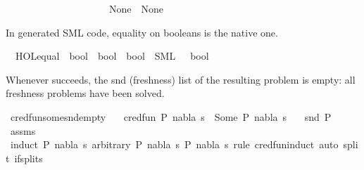 \begin{isabellebody}
\ \ \ \ \ \ \ \ \ \ \ \ \ \ \ \ \ \ \ \ {\isacharbar}{\kern0pt}\ None\ {\isasymRightarrow}\ None{\isacharparenright}{\kern0pt}{\isachardoublequoteclose}%
\begin{isamarkuptext}%
In generated SML code, equality on booleans is the native one.%
\end{isamarkuptext}\isamarkuptrue%
\isamarkupfalse%
\ \ {\isachardoublequoteopen}HOL{\isachardot}{\kern0pt}equal\ {\isacharcolon}{\kern0pt}{\isacharcolon}{\kern0pt}\ bool\ {\isasymRightarrow}\ bool\ {\isasymRightarrow}\ bool{\isachardoublequoteclose}\ {\isasymrightharpoonup}\ {\isacharparenleft}{\kern0pt}SML{\isacharparenright}{\kern0pt}\ {\isachardoublequoteopen}{\isacharbang}{\kern0pt}{\isacharparenleft}{\kern0pt}{\isacharparenleft}{\kern0pt}{\isacharunderscore}{\kern0pt}\ {\isacharcolon}{\kern0pt}\ bool{\isacharparenright}{\kern0pt}\ {\isacharequal}{\kern0pt}\ {\isacharunderscore}{\kern0pt}{\isacharparenright}{\kern0pt}{\isachardoublequoteclose}%
\begin{isamarkuptext}%
Whenever  succeeds, the snd (freshness) list of the resulting problem is empty:
all freshness problems have been solved.%
\end{isamarkuptext}\isamarkuptrue%
\isamarkupfalse%
\ cred{\isacharunderscore}{\kern0pt}fun{\isacharunderscore}{\kern0pt}some{\isacharunderscore}{\kern0pt}snd{\isacharunderscore}{\kern0pt}empty{\isacharcolon}{\kern0pt}\isanewline
\ \ \ {\isachardoublequoteopen}cred{\isacharunderscore}{\kern0pt}fun\ {\isacharparenleft}{\kern0pt}P{\isacharcomma}{\kern0pt}\ nabla{\isacharcomma}{\kern0pt}\ s{\isacharparenright}{\kern0pt}\ {\isacharequal}{\kern0pt}\ Some\ {\isacharparenleft}{\kern0pt}P{\isacharprime}{\kern0pt}{\isacharcomma}{\kern0pt}\ nabla{\isacharprime}{\kern0pt}{\isacharcomma}{\kern0pt}\ s{\isacharprime}{\kern0pt}{\isacharparenright}{\kern0pt}{\isachardoublequoteclose}\isanewline
\ \ \ {\isachardoublequoteopen}snd\ P{\isacharprime}{\kern0pt}\ {\isacharequal}{\kern0pt}\ {\isacharbrackleft}{\kern0pt}{\isacharbrackright}{\kern0pt}{\isachardoublequoteclose}\isanewline
%
\isadelimproof
\ \ %
\endisadelimproof
%
\isatagproof
{}\isamarkupfalse%
\ assms\ \isamarkupfalse%
\ {\isacharparenleft}{\kern0pt}induct\ {\isachardoublequoteopen}{\isacharparenleft}{\kern0pt}P{\isacharcomma}{\kern0pt}\ nabla{\isacharcomma}{\kern0pt}\ s{\isacharparenright}{\kern0pt}{\isachardoublequoteclose}\ arbitrary{\isacharcolon}{\kern0pt}\ P\ nabla\ s\ P{\isacharprime}{\kern0pt}\ nabla{\isacharprime}{\kern0pt}\ s{\isacharprime}{\kern0pt}\ rule{\isacharcolon}{\kern0pt}\ cred{\isacharunderscore}{\kern0pt}fun{\isachardot}{\kern0pt}induct{\isacharcomma}{\kern0pt}\ auto\ split{\isacharcolon}{\kern0pt}\ if{\isacharunderscore}{\kern0pt}splits{\isacharparenright}{\kern0pt}%
\endisatagproof
{\isafoldproof}%
%
\isadelimproof
\isanewline
%
\endisadelimproof
\isanewline
%
\isadelimtheory
%
\endisadelimtheory
%
\isatagtheory
%
\endisatagtheory
{\isafoldtheory}%
%
\isadelimtheory
%
\endisadelimtheory
%
\end{isabellebody}%
